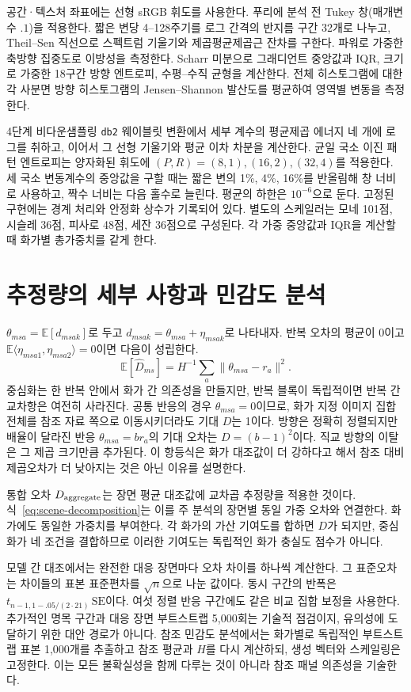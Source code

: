 \documentclass[11pt,a4paper]{article}
\begin{document}
공간·텍스처 좌표에는 선형 sRGB 휘도를 사용한다. 푸리에 분석 전 Tukey 창(매개변수 $.1$)을 적용한다. 짧은 변당 4--128주기를 로그 간격의 반지름 구간 32개로 나누고, Theil--Sen 직선으로 스펙트럼 기울기와 제곱평균제곱근 잔차를 구한다. 파워로 가중한 축방향 집중도로 이방성을 측정한다. Scharr 미분으로 그래디언트 중앙값과 IQR, 크기로 가중한 18구간 방향 엔트로피, 수평--수직 균형을 계산한다. 전체 히스토그램에 대한 각 사분면 방향 히스토그램의 Jensen--Shannon 발산도를 평균하여 영역별 변동을 측정한다.

4단계 비다운샘플링 \texttt{db2} 웨이블릿 변환에서 세부 계수의 평균제곱 에너지 네 개에 로그를 취하고, 이어서 그 선형 기울기와 평균 이차 차분을 계산한다\citep{mallat1989wavelet}. 균일 국소 이진 패턴 엔트로피는 양자화된 휘도에 $(P,R)=(8,1),(16,2),(32,4)$를 적용한다\citep{ojala2002lbp}. 세 국소 변동계수의 중앙값을 구할 때는 짧은 변의 1\%, 4\%, 16\%를 반올림해 창 너비로 사용하고, 짝수 너비는 다음 홀수로 늘린다. 평균의 하한은 $10^{-6}$으로 둔다. 고정된 구현에는 경계 처리와 안정화 상수가 기록되어 있다. 별도의 스케일러는 모네 101점, 시슬레 36점, 피사로 48점, 세잔 36점으로 구성된다. 각 가중 중앙값과 IQR을 계산할 때 화가별 총가중치를 같게 한다.

\section{추정량의 세부 사항과 민감도 분석}\label{app:estimation}
$\theta_{msa}=\mathbb E[d_{msak}]$로 두고 $d_{msak}=\theta_{msa}+\eta_{msak}$로 나타내자. 반복 오차의 평균이 0이고 $\mathbb E\langle\eta_{msa1},\eta_{msa2}\rangle=0$이면 다음이 성립한다.
\[
 \mathbb E[\widehat D_{ms}]
 =H^{-1}\sum_a\|\theta_{msa}-r_a\|^2.
\]
중심화는 한 반복 안에서 화가 간 의존성을 만들지만, 반복 블록이 독립적이면 반복 간 교차항은 여전히 사라진다. 공통 반응의 경우 $\theta_{msa}=0$이므로, 화가 지정 이미지 집합 전체를 참조 자료 쪽으로 이동시키더라도 기대 $D$는 1이다. 방향은 정확히 정렬되지만 배율이 달라진 반응 $\theta_{msa}=br_a$의 기대 오차는 $D=(b-1)^2$이다. 직교 방향의 이탈은 그 제곱 크기만큼 추가된다. 이 항등식은 화가 대조값이 더 강하다고 해서 참조 대비 제곱오차가 더 낮아지는 것은 아닌 이유를 설명한다.

통합 오차 $D_{\rm aggregate}$는 장면 평균 대조값에 교차곱 추정량을 적용한 것이다. 식~\ref{eq:scene-decomposition}는 이를 주 분석의 장면별 동일 가중 오차와 연결한다. 화가에도 동일한 가중치를 부여한다. 각 화가의 가산 기여도를 합하면 $D$가 되지만, 중심화가 네 조건을 결합하므로 이러한 기여도는 독립적인 화가 충실도 점수가 아니다.

모델 간 대조에서는 완전한 대응 장면마다 오차 차이를 하나씩 계산한다. 그 표준오차는 차이들의 표본 표준편차를 $\sqrt n$으로 나눈 값이다. 동시 구간의 반폭은 $t_{n-1,1-.05/(2\cdot21)}\,\mathrm{SE}$이다. 여섯 정렬 반응 구간에도 같은 비교 집합 보정을 사용한다. 추가적인 명목 구간과 대응 장면 부트스트랩 5,000회는 기술적 점검이지, 유의성에 도달하기 위한 대안 경로가 아니다. 참조 민감도 분석에서는 화가별로 독립적인 부트스트랩 표본 1,000개를 추출하고 참조 평균과 $H$를 다시 계산하되, 생성 벡터와 스케일링은 고정한다. 이는 모든 불확실성을 함께 다루는 것이 아니라 참조 패널 의존성을 기술한다.
\end{document}
